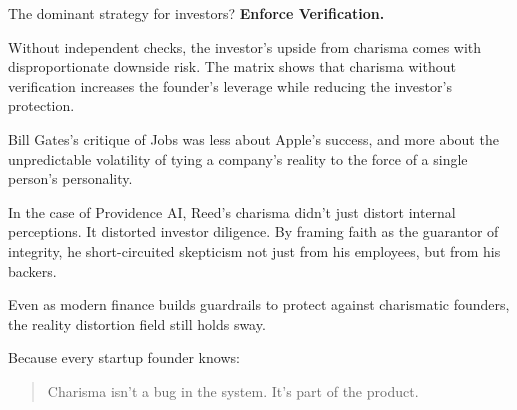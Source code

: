     The dominant strategy for investors?  
    \textbf{Enforce Verification.}
    
    Without independent checks, the investor’s upside from charisma comes with disproportionate downside risk. The matrix shows that charisma without verification increases the founder’s leverage while reducing the investor’s protection.
    
    \medskip
    
    Bill Gates’s critique of Jobs was less about Apple’s success, and more about the unpredictable volatility of tying a company’s reality to the force of a single person’s personality.
    
    In the case of Providence AI\texttrademark{}, Reed’s charisma didn’t just distort internal perceptions. It distorted investor diligence.  
    By framing faith as the guarantor of integrity, he short-circuited skepticism not just from his employees, but from his backers.
    
    \medskip
    
    Even as modern finance builds guardrails to protect against charismatic founders,  
    the reality distortion field still holds sway.
    
    Because every startup founder knows:
    
    \begin{quote}
    Charisma isn’t a bug in the system.  It’s part of the product.
    \end{quote}
    